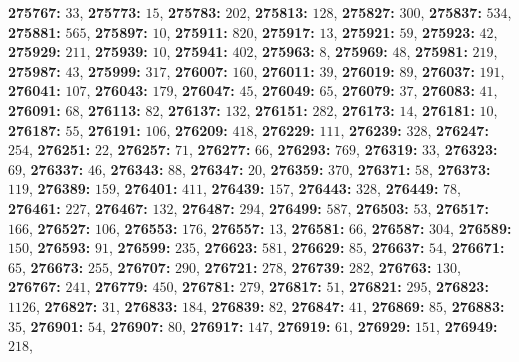 \textsf{\bfseries 275767:} $33$, \textsf{\bfseries 275773:} $15$, \textsf{\bfseries 275783:} $202$, \textsf{\bfseries 275813:} $128$, \textsf{\bfseries 275827:} $300$, \textsf{\bfseries 275837:} $534$, \textsf{\bfseries 275881:} $565$, \textsf{\bfseries 275897:} $10$, \textsf{\bfseries 275911:} $820$, \textsf{\bfseries 275917:} $13$, \textsf{\bfseries 275921:} $59$, \textsf{\bfseries 275923:} $42$, \textsf{\bfseries 275929:} $211$, \textsf{\bfseries 275939:} $10$, \textsf{\bfseries 275941:} $402$, \textsf{\bfseries 275963:} $8$, \textsf{\bfseries 275969:} $48$, \textsf{\bfseries 275981:} $219$, \textsf{\bfseries 275987:} $43$, \textsf{\bfseries 275999:} $317$, \textsf{\bfseries 276007:} $160$, \textsf{\bfseries 276011:} $39$, \textsf{\bfseries 276019:} $89$, \textsf{\bfseries 276037:} $191$, \textsf{\bfseries 276041:} $107$, \textsf{\bfseries 276043:} $179$, \textsf{\bfseries 276047:} $45$, \textsf{\bfseries 276049:} $65$, \textsf{\bfseries 276079:} $37$, \textsf{\bfseries 276083:} $41$, \textsf{\bfseries 276091:} $68$, \textsf{\bfseries 276113:} $82$, \textsf{\bfseries 276137:} $132$, \textsf{\bfseries 276151:} $282$, \textsf{\bfseries 276173:} $14$, \textsf{\bfseries 276181:} $10$, \textsf{\bfseries 276187:} $55$, \textsf{\bfseries 276191:} $106$, \textsf{\bfseries 276209:} $418$, \textsf{\bfseries 276229:} $111$, \textsf{\bfseries 276239:} $328$, \textsf{\bfseries 276247:} $254$, \textsf{\bfseries 276251:} $22$, \textsf{\bfseries 276257:} $71$, \textsf{\bfseries 276277:} $66$, \textsf{\bfseries 276293:} $769$, \textsf{\bfseries 276319:} $33$, \textsf{\bfseries 276323:} $69$, \textsf{\bfseries 276337:} $46$, \textsf{\bfseries 276343:} $88$, \textsf{\bfseries 276347:} $20$, \textsf{\bfseries 276359:} $370$, \textsf{\bfseries 276371:} $58$, \textsf{\bfseries 276373:} $119$, \textsf{\bfseries 276389:} $159$, \textsf{\bfseries 276401:} $411$, \textsf{\bfseries 276439:} $157$, \textsf{\bfseries 276443:} $328$, \textsf{\bfseries 276449:} $78$, \textsf{\bfseries 276461:} $227$, \textsf{\bfseries 276467:} $132$, \textsf{\bfseries 276487:} $294$, \textsf{\bfseries 276499:} $587$, \textsf{\bfseries 276503:} $53$, \textsf{\bfseries 276517:} $166$, \textsf{\bfseries 276527:} $106$, \textsf{\bfseries 276553:} $176$, \textsf{\bfseries 276557:} $13$, \textsf{\bfseries 276581:} $66$, \textsf{\bfseries 276587:} $304$, \textsf{\bfseries 276589:} $150$, \textsf{\bfseries 276593:} $91$, \textsf{\bfseries 276599:} $235$, \textsf{\bfseries 276623:} $581$, \textsf{\bfseries 276629:} $85$, \textsf{\bfseries 276637:} $54$, \textsf{\bfseries 276671:} $65$, \textsf{\bfseries 276673:} $255$, \textsf{\bfseries 276707:} $290$, \textsf{\bfseries 276721:} $278$, \textsf{\bfseries 276739:} $282$, \textsf{\bfseries 276763:} $130$, \textsf{\bfseries 276767:} $241$, \textsf{\bfseries 276779:} $450$, \textsf{\bfseries 276781:} $279$, \textsf{\bfseries 276817:} $51$, \textsf{\bfseries 276821:} $295$, \textsf{\bfseries 276823:} $1126$, \textsf{\bfseries 276827:} $31$, \textsf{\bfseries 276833:} $184$, \textsf{\bfseries 276839:} $82$, \textsf{\bfseries 276847:} $41$, \textsf{\bfseries 276869:} $85$, \textsf{\bfseries 276883:} $35$, \textsf{\bfseries 276901:} $54$, \textsf{\bfseries 276907:} $80$, \textsf{\bfseries 276917:} $147$, \textsf{\bfseries 276919:} $61$, \textsf{\bfseries 276929:} $151$, \textsf{\bfseries 276949:} $218$, 
